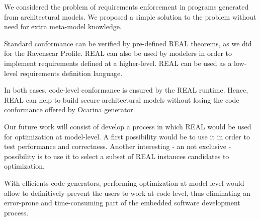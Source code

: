 We considered the problem of requirements enforcement in 
programs generated from architectural models. We proposed a simple
solution to the problem without need for extra meta-model knowledge.

Standard conformance can be verified by pre-defined REAL theorems,
as we did for the Ravenscar Profile. REAL can also be used by
modelers in order to implement requirements defined at a
higher-level. REAL can be used as a low-level requirements
definition language.

In both cases, code-level conformance is ensured by the REAL
runtime.  Hence, REAL can help to build secure architectural models
without losing the code conformance offered by Ocarina generator.

Our future work will consist of develop a process in which REAL
would be used for optimization at model-level. A first possibility
would be to use it in order to test performance and
correctness. Another interesting - an not exclusive - possibility is
to use it to select a subset of REAL instances candidates to
optimization.

With efficients code generators, performing optimization at model
level would allow to definitively prevent the users to work at
code-level, thus eliminating an error-prone and time-consuming part of
the embedded software development process.
